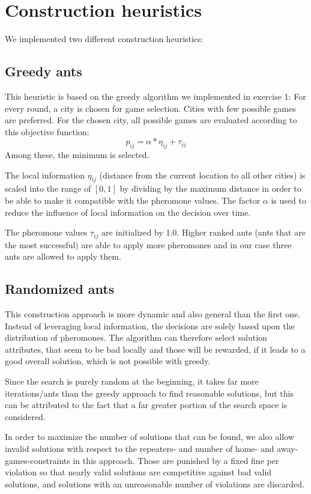 \section{Construction heuristics}

We implemented two different construction heuristics:

\subsection{Greedy ants}
This heuristic is based on the greedy algorithm we implemented in exercise 1: For every round, a city is chosen for game selection.
Cities with few possible games are preferred.
For the chosen city, all possible games are evaluated according to this objective function:
$$ p_{ij} = \alpha * \eta_{ij} + \tau_{ij}  $$
Among these, the minimum is selected.

The local information $\eta_{ij}$ (distance from the current location to all other cities) is scaled into the range of $[0,1]$ by dividing by the maximum distance in order to be able to make it compatible with the pheromone values.
The factor $\alpha$ is used to reduce the influence of local information on the decision over time.

The pheromone values $\tau_{ij}$ are initialized by 1.0.
Higher ranked ants (ants that are the most successful) are able to apply more
pheromones and in our case three ants are allowed to apply them.

\subsection{Randomized ants}

This construction approach is more dynamic and also general than the first one.
Instead of leveraging local information, the decisions are solely based upon the distribution of pheromones. 
The algorithm can therefore select solution attributes, that seem to be bad locally and those will be rewarded, if it leads to a good overall solution, which is not possible with greedy.

Since the search is purely random at the beginning, it takes far more iterations/ants than the greedy approach to find reasonable solutions, but this can be attributed to the fact that a far greater portion of the search space is considered. 

In order to maximize the number of solutions that can be found, we also allow invalid solutions with respect to the repeaters- and number of home- and away-games-constraints in this approach.
Those are punished by a fixed fine per violation so that nearly valid solutions are competitive against bad valid solutions, and solutions with an unreasonable number of violations are discarded.

